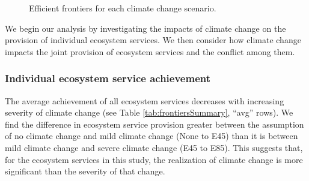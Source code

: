 \begin{figure}[ht!]
  \hfill\centering
  \caption[Frontiers for each climate change scenario]{Efficient frontiers for each climate change scenario.}
  \label{fig:frontiersAll}
\end{figure}

We begin our analysis by investigating the impacts of climate change on the provision of individual ecosystem services. We then consider how climate change impacts the joint provision of ecosystem services and the conflict among them.

\subsubsection{Individual ecosystem service achievement}
The average achievement of all ecosystem services decreases with increasing severity of climate change (see Table \ref{tab:frontiersSummary}, ``avg'' rows). We find the difference in ecosystem service provision greater between the assumption of no climate change and mild climate change (None to E45) than it is between mild climate change and severe climate change (E45 to E85). This suggests that, for the ecosystem services in this study, the realization of climate change is more significant than the severity of that change.

